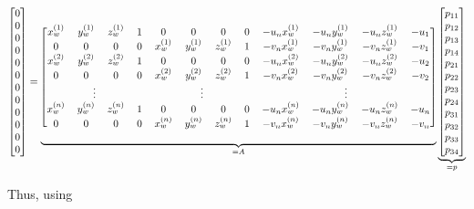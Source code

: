 \setcounter{MaxMatrixCols}{20}
\begin{equation} 
    \scalemath{0.9}{
        \begin{bmatrix}
            0 \\ 0 \\ 0 \\ 0 \\ 0 \\ 0 \\ 0 \\ 0 \\ 0 \\ 0 \\ 0 \\ 0
        \end{bmatrix}
        =
        \underbrace{
            \begin{blockarray}{[*{12}c]}
                x_w^{(1)} & y_w^{(1)} & z_w^{(1)} & 1 & 0         & 0         & 0         & 0 & -u_nx_w^{(1)} & -u_ny_w^{(1)} & -u_nz_w^{(1)} & -u_1 \\
                0         & 0         & 0         & 0 & x_w^{(1)} & y_w^{(1)} & z_w^{(1)} & 1 & -v_nx_w^{(1)} & -v_ny_w^{(1)} & -v_nz_w^{(1)} & -v_1 \\
                x_w^{(2)} & y_w^{(2)} & z_w^{(2)} & 1 & 0         & 0         & 0         & 0 & -u_nx_w^{(2)} & -u_ny_w^{(2)} & -u_nz_w^{(2)} & -u_2 \\
                0         & 0         & 0         & 0 & x_w^{(2)} & y_w^{(2)} & z_w^{(2)} & 1 & -v_nx_w^{(2)} & -v_ny_w^{(2)} & -v_nz_w^{(2)} & -v_2 \\
                \BAmulticolumn{4}{c}{\vdots} & \BAmulticolumn{4}{c}{\vdots} &\BAmulticolumn{4}{c}{\vdots} \\
                x_w^{(n)} & y_w^{(n)} & z_w^{(n)} & 1 & 0         & 0         & 0         & 0 & -u_nx_w^{(n)} & -u_ny_w^{(n)} & -u_nz_w^{(n)} & -u_n \\
                0         & 0         & 0         & 0 & x_w^{(n)} & y_w^{(n)} & z_w^{(n)} & 1 & -v_nx_w^{(n)} & -v_ny_w^{(n)} & -v_nz_w^{(n)} & -v_n
            \end{blockarray}
        }_{=A}
        \underbrace{
            \begin{bmatrix}
                p_{11} \\ p_{12} \\ p_{13} \\ p_{14} \\ p_{21} \\ p_{22} \\ p_{23} \\ p_{24} \\ p_{31} \\ p_{32} \\ p_{33} \\ p_{34}
            \end{bmatrix}
        }_{=p}
    }
\end{equation}

Thus, using


